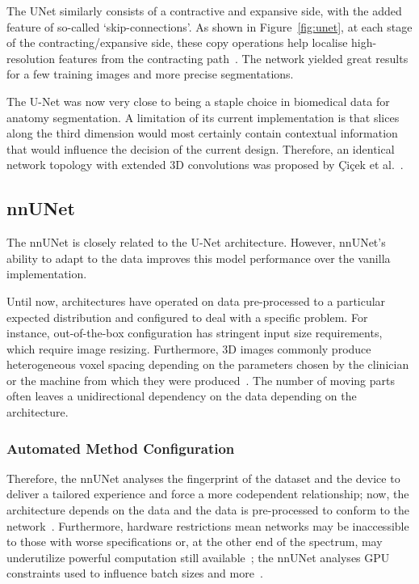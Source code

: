 \documentclass[12pt,twoside]{report}
\begin{document}
The UNet similarly consists of a contractive and expansive side, with the added feature of so-called `skip-connections'. As shown in Figure~\ref{fig:unet}, at each stage of the contracting/expansive side, these copy operations help localise high-resolution features from the contracting path~\cite{U-Net}. The network yielded great results for a few training images and more precise segmentations.

The U-Net was now very close to being a staple choice in biomedical data for anatomy segmentation. A limitation of its current implementation is that slices along the third dimension would most certainly contain contextual information that would influence the decision of the current design. Therefore, an identical network topology with extended 3D convolutions was proposed by \c{C}i{\c{c}}ek et al.~\cite{DBLP:journals/corr/CicekALBR16}.

\subsection{nnUNet}\label{sect:nnunet}

The nnUNet is closely related to the U-Net architecture. However, nnUNet's ability to adapt to the data improves this model performance over the vanilla implementation.

Until now, architectures have operated on data pre-processed to a particular expected distribution and configured to deal with a specific problem. For instance, out-of-the-box configuration has stringent input size requirements, which require image resizing. Furthermore, 3D images commonly produce heterogeneous voxel spacing depending on the parameters chosen by the clinician or the machine from which they were produced~\cite{nnunet}. The number of moving parts often leaves a unidirectional dependency on the data depending on the architecture. 

\subsubsection{Automated Method Configuration}

Therefore, the nnUNet analyses the fingerprint of the dataset and the device to deliver a tailored experience and force a more codependent relationship; now, the architecture depends on the data and the data is pre-processed to conform to the network~\cite{nnunet}. Furthermore, hardware restrictions mean networks may be inaccessible to those with worse specifications or, at the other end of the spectrum, may underutilize powerful computation still available~\cite{nnunet}; the nnUNet analyses GPU constraints used to influence batch sizes and more~\cite{nnunet-git-paper}.
\end{document}
